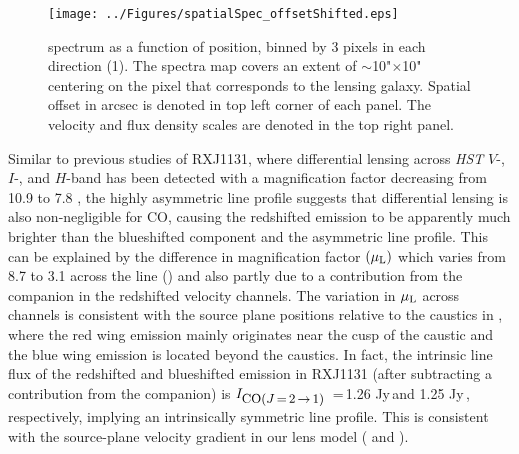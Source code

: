 \documentclass[]{emulateapj}
\begin{document}
\begin{figure}[!htbp]
\centering
\texttt{[image: ../Figures/spatialSpec\_offsetShifted.eps]}
\caption{
\bco spectrum as a function of position, binned by 3 pixels in each
direction (1).
The spectra map covers an extent of $\sim$10"$\times$10"
centering on the pixel that corresponds to the lensing galaxy.
Spatial offset in arcsec is denoted in top left corner of each panel.
The velocity and flux density scales are denoted in the top right panel.
\label{fig:spatialSpec}}
\end{figure}


Similar to previous studies of RXJ1131, where
differential lensing across {\it HST}
$V$-, $I$-, and $H$-band has been detected with a
magnification factor decreasing from 10.9 to 7.8 ,
the highly asymmetric \bco line profile suggests that
differential lensing is also non-negligible for CO,
causing the redshifted emission to be apparently much brighter than the
blueshifted component and the asymmetric line profile.
This can be explained by the difference in magnification factor $(\mu_{\rm L})$ which
varies from 8.7 to 3.1 across the \bco line () and also partly due to a contribution from the companion in the redshifted velocity channels.
The variation in $\mu_{\rm L}$ across channels is consistent with the source plane
positions relative to the caustics in , where the red wing
emission mainly originates near the cusp
of the caustic and the blue wing emission is located beyond the caustics.
In fact, the intrinsic line flux of the redshifted and
blueshifted emission in RXJ1131 (after subtracting a contribution from the companion)
is $I_{\small \mbox{CO($J$\,=\,2\,$\rightarrow$\,1) }}$\,=\,1.26 Jy\,\kms and 1.25 Jy\,\kms, respectively,
implying an intrinsically symmetric line profile. This is consistent with the source-plane
velocity gradient in our lens model ( and ).
\end{document}
